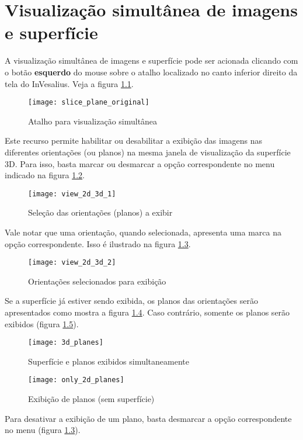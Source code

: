 \chapter{Visualização simultânea de imagens e superfície}

A visualização simultânea de imagens e superfície pode ser acionada clicando com o botão
\textbf{esquerdo} do mouse sobre o atalho localizado no canto inferior direito da tela do
InVesalius. Veja a figura \ref{fig:slice_plane_original}.

\begin{figure}[!htb]
\centering
\texttt{[image: slice\_plane\_original]}
\caption{Atalho para visualização simultânea}
\label{fig:slice_plane_original}
\end{figure}

Este recurso permite habilitar ou desabilitar a exibição das imagens nas diferentes
orientações (ou planos) na mesma janela de visualização da superfície 3D. Para isso, basta
marcar ou desmarcar a opção correspondente no menu indicado na figura \ref{fig:view_2d_3d_1}.

\begin{figure}[!htb]
\centering
\texttt{[image: view\_2d\_3d\_1]}
\caption{Seleção das orientações (planos) a exibir}
\label{fig:view_2d_3d_1}
\end{figure}

Vale notar que uma orientação, quando selecionada, apresenta uma marca na opção correspondente.
Isso é ilustrado na figura \ref{fig:view_2d_3d_2}.

\begin{figure}[!htb]
\centering
\texttt{[image: view\_2d\_3d\_2]}
\caption{Orientações selecionados para exibição}
\label{fig:view_2d_3d_2}
\end{figure}


\newpage


Se a superfície já estiver sendo exibida, os planos das orientações serão apresentados como mostra
a figura \ref{fig:3d_planes}. Caso contrário, somente os planos serão exibidos
(figura \ref{fig:only_2d_planes}).

\begin{figure}[!htb]
\centering
\texttt{[image: 3d\_planes]}
\caption{Superfície e planos exibidos simultaneamente}
\label{fig:3d_planes}
\end{figure}

\begin{figure}[!htb]
\centering
\texttt{[image: only\_2d\_planes]}
\caption{Exibição de planos (sem superfície)}
\label{fig:only_2d_planes}
\end{figure}

\newpage

Para desativar a exibição de um plano, basta desmarcar a opção correspondente no menu
(figura \ref{fig:view_2d_3d_2}).
